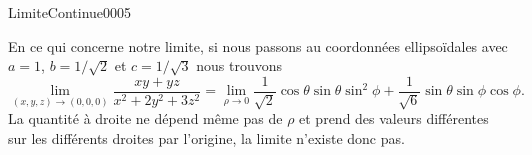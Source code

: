 \begin{corrige}{LimiteContinue0005}
\begin{enumerate}
                                        En ce qui concerne notre limite, si nous passons au coordonnées ellipsoïdales avec $a=1$, $b=1/\sqrt{2}$ et $c=1/\sqrt{3}$ nous trouvons 
                                        \begin{equation}
                                          \lim_{(x,y,z)\to(0,0,0)} \frac{xy+yz}{x^2+2y^2+3z^2}=\lim_{\rho\to 0} \frac{1}{\sqrt{2}}\cos\theta\sin\theta\sin^2\phi+\frac{1}{\sqrt{6}}\sin\theta\sin\phi\cos\phi.
                                        \end{equation}
                                        La quantité à droite ne dépend même pas de $\rho$ et prend des valeurs différentes sur les différents droites par l'origine, la limite n'existe donc  pas. 
	\end{enumerate}
\end{corrige}
